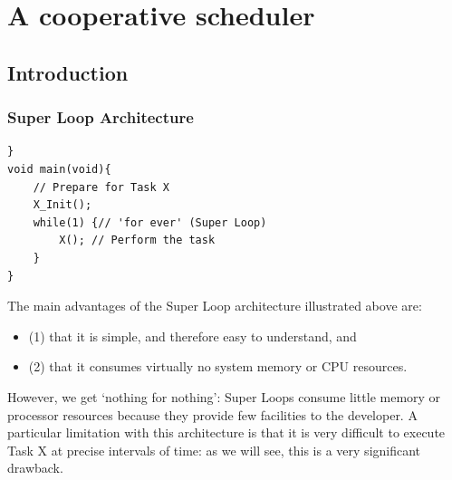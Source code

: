 \renewcommand{\thesubsection}{\arabic{subsection}}
\renewcommand{\thesubsubsection}{\thesubsection.\arabic{subsubsection}}
\section{A cooperative scheduler}

\subsection{Introduction}
\subsubsection{Super Loop Architecture}
\begin{lstlisting}[basicstyle=\small, caption=Super loop program,label = {program_super_loop}]
}
void main(void){
    // Prepare for Task X
    X_Init();
    while(1) {// 'for ever' (Super Loop)
        X(); // Perform the task
    } 
}
\end{lstlisting}
The main advantages of the Super Loop architecture illustrated above are:
\begin{itemize}
    \item (1) that it is simple, and therefore easy to understand, and 
    \item (2) that it consumes virtually no system memory or CPU resources.
\end{itemize}

However, we get ‘nothing for nothing’: Super Loops consume little memory or
processor resources because they provide few facilities to the developer. A particular
limitation with this architecture is that it is very difficult to execute Task X at precise
intervals of time: as we will see, this is a very significant drawback.

